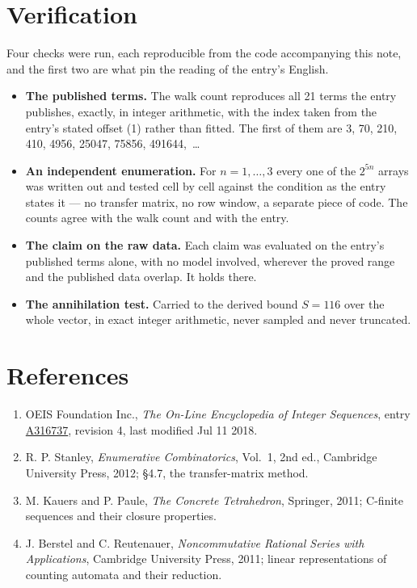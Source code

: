 \documentclass[11pt]{article}
\theoremstyle{definition}
\begin{document}
\section{Verification}

Four checks were run, each reproducible from the code accompanying this note, and the first two are what pin the reading of the entry's English.

\begin{itemize}

\item {\bfseries The published terms.} The walk count reproduces all 21 terms the entry publishes, exactly, in integer arithmetic, with the index taken from the entry's stated offset (1) rather than fitted. The first of them are 3, 70, 210, 410, 4956, 25047, 75856, 491644,~\dots

\item {\bfseries An independent enumeration.} For $n = 1,\dots,3$ every one of the $2^{5n}$ arrays was written out and tested cell by cell against the condition as the entry states it --- no transfer matrix, no row window, a separate piece of code. The counts agree with the walk count and with the entry.

\item {\bfseries The claim on the raw data.} Each claim was evaluated on the entry's published terms alone, with no model involved, wherever the proved range and the published data overlap. It holds there.

\item {\bfseries The annihilation test.} Carried to the derived bound $S = 116$ over the whole vector, in exact integer arithmetic, never sampled and never truncated.

\end{itemize}

\section{References}

\begin{enumerate}

\item OEIS Foundation Inc., \emph{The On-Line Encyclopedia of Integer Sequences}, entry \href{https://oeis.org/A316737}{A316737}, revision 4, last modified Jul 11 2018.

\item R. P. Stanley, \emph{Enumerative Combinatorics}, Vol.~1, 2nd ed., Cambridge University Press, 2012; \S4.7, the transfer-matrix method.

\item M. Kauers and P. Paule, \emph{The Concrete Tetrahedron}, Springer, 2011; C-finite sequences and their closure properties.

\item J. Berstel and C. Reutenauer, \emph{Noncommutative Rational Series with Applications}, Cambridge University Press, 2011; linear representations of counting automata and their reduction.

\end{enumerate}
\end{document}
